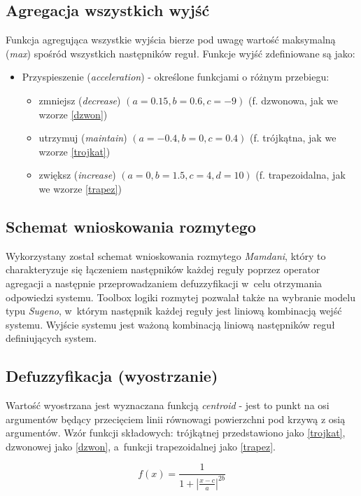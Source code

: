 \documentclass[11pt,a4paper]{article}
\begin{document}
\subsection{Agregacja wszystkich wyjść}
Funkcja agregująca wszystkie wyjścia bierze pod uwagę wartość maksymalną (\emph{max}) spośród wszystkich następników reguł. Funkcje wyjść zdefiniowane są jako:
\begin{itemize}
\item Przyspieszenie (\emph{acceleration}) - określone funkcjami o różnym przebiegu:
\begin{itemize}
\item zmniejsz (\emph{decrease}) $(a=0.15, b=0.6, c=-9)$ (f. dzwonowa, jak we wzorze \ref{dzwon})
\item utrzymuj (\emph{maintain}) $(a=-0.4, b=0, c=0.4)$ (f. trójkątna, jak we wzorze  \ref{trojkat})
\item zwiększ (\emph{increase}) $(a=0, b=1.5, c=4, d=10)$ (f. trapezoidalna, jak we wzorze \ref{trapez})
\end{itemize}
\end{itemize}

\subsection{Schemat wnioskowania rozmytego}
Wykorzystany został schemat wnioskowania rozmytego \emph{Mamdani}, który to charakteryzuje się łączeniem następników każdej reguły poprzez
operator agregacji a następnie przeprowadzaniem defuzzyfikacji w~celu otrzymania odpowiedzi systemu. Toolbox logiki rozmytej pozwalał także na wybranie modelu typu \emph{Sugeno}, w~którym następnik każdej reguły jest liniową kombinacją wejść systemu. Wyjście systemu jest ważoną kombinacją liniową następników reguł definiujących system.

\subsection{Defuzzyfikacja (wyostrzanie)}
Wartość wyostrzana jest wyznaczana funkcją \emph{centroid} - jest to punkt na osi argumentów będący przecięciem linii równowagi powierzchni pod krzywą z osią argumentów. Wzór funkcji składowych: trójkątnej przedstawiono jako \ref{trojkat}, dzwonowej jako \ref{dzwon}, a~funkcji trapezoidalnej jako \ref{trapez}.

\begin{equation}f(x)=\frac{1}{ 1+{|\frac{x-c}{a}|}^{2b} }
\label{dzwon}\end{equation}
\end{document}
